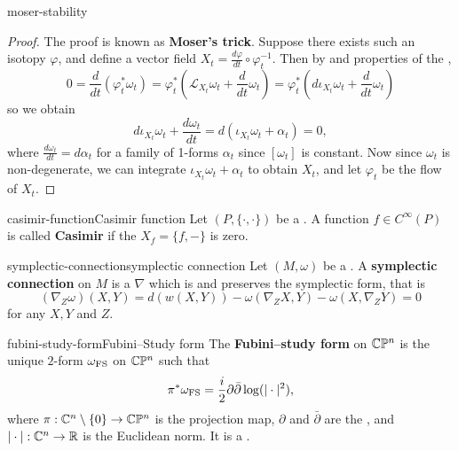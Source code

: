 \begin{example}{moser-stability}
    \begin{proof}
        The proof is known as \textbf{Moser's trick}. Suppose there exists such an isotopy $\varphi$, and define a vector field $X_t = \frac{d \varphi}{d t} \circ \varphi_t^{-1}$. Then by  and properties of the ,
        \[ 0 = \frac{d}{dt} \left(\varphi_t^* \omega_t\right) = \varphi_t^* \left(\mathcal{L}_{X_t} \omega_t + \frac{d}{dt} \omega_t \right) = \varphi_t^* \left(d \iota_{X_t} \omega_t + \frac{d}{dt} \omega_t \right) \]
        so we obtain
        \[ d \iota_{X_t} \omega_t + \frac{d \omega_t}{dt} = d(\iota_{X_t} \omega_t + \alpha_t) = 0 , \]
        where $\frac{d \omega_t}{d t} = d \alpha_t$ for a family of 1-forms $\alpha_t$ since $[\omega_t]$ is constant. Now since $\omega_t$ is non-degenerate, we can integrate $\iota_{X_t} \omega_t + \alpha_t$ to obtain $X_t$, and let $\varphi_t$ be the flow of $X_t$.
    \end{proof}
\end{example}

\begin{topic}{casimir-function}{Casimir function}
    Let $(P, \{ \cdot, \cdot \})$ be a . A function $f \in C^\infty(P)$ is called \textbf{Casimir} if the  $X_f = \{ f, - \}$ is zero.
\end{topic}

\begin{topic}{symplectic-connection}{symplectic connection}
    Let $(M, \omega)$ be a . A \textbf{symplectic connection} on $M$ is a  $\nabla$ which is  and preserves the symplectic form, that is
    \[ (\nabla_Z \omega)(X, Y) = d(w(X, Y)) - \omega(\nabla_Z X, Y) - \omega(X, \nabla_Z Y) = 0 \]
    for any  $X, Y$ and $Z$.
\end{topic}

\begin{topic}{fubini-study-form}{Fubini--Study form}
    The \textbf{Fubini--study form} on $\mathbb{C} \mathbb{P}^n$ is the unique $2$-form $\omega_\textup{FS}$ on $\mathbb{C} \mathbb{P}^n$ such that
    \[ \pi^* \omega_\textup{FS} = \frac{i}{2} \partial \bar{\partial} \log (|\cdot|^2) , \]
    where $\pi : \mathbb{C}^n \setminus \{ 0 \} \to \mathbb{C} \mathbb{P}^n$ is the projection map, $\partial$ and $\bar{\partial}$ are the , and $|\cdot| : \mathbb{C}^n \to \mathbb{R}$ is the Euclidean norm. It is a .
\end{topic}

